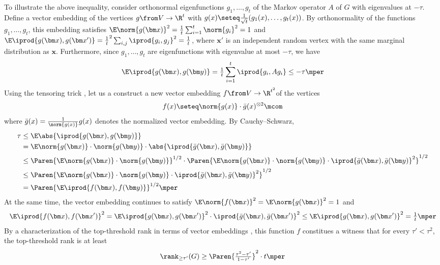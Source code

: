 To illustrate the above inequality, consider orthonormal eigenfunctions \(g_{1},\ldots,g_{t}\) of the Markov operator \(A\) of \(G\) with eigenvalues at \(-\tau\).
Define a vector embedding of the vertices \(g\from V\to \R^{t}\) with \(g(x)\seteq \tfrac 1{\sqrt t}(g_{1}(x),\ldots,g_{t}(x))\).
By orthonormality of the functions \(g_{1},\ldots,g_{t}\), this embedding satisfies \(\E\norm{g(\bm x)}^{2}=\tfrac 1 t\sum_{i=1}^{t}\norm{g_{i}}^{2}=1\) and \(\E\iprod{g(\bm x),g(\bm x')}=\tfrac 1 t^{2}\sum_{i,j}\iprod{g_{i},g_{j}}^{2}=\tfrac 1 t\), where \(\bm x'\) is an independent random vertex with the same marginal distribution as \(\bm x\).
Furthermore, since \(g_{1},\ldots,g_{t}\) are eigenfunctions with eigenvalue at most \(-\tau\), we have
\begin{equation}
  \E \iprod{g(\bm x),g(\bm y)}=\tfrac 1 t \sum_{i=1}^{t} \iprod{g_{i},A g_{i}} \le -\tau
  \mper
\end{equation}
Using the tensoring trick \cite{khot-vishnoi,arora-khot-kolla-steurer-tulsiani-vishnoi}, let us a construct a new vector embedding \(f\from V\to \R^{t^{2}}\)of the vertices
\begin{equation}
  f(x) \seteq \norm{g(x)} \cdot \bar g(x)^{\otimes 2}\mcom
\end{equation}
where \(\bar g(x)=\tfrac 1{\norm{g(x)}}g(x)\) denotes the normalized vector embedding.
By Cauchy--Schwarz,
\begin{align}
  \tau
  &\le \E \abs{\iprod{g(\bm x),g(\bm y)}}\\
  &=\E \norm{g(\bm x)}\cdot \norm{g(\bm y)}\cdot \abs{\iprod{\bar g(\bm x),\bar g(\bm y)}}\\
  &\le \Paren{\E \norm{g(\bm x)}\cdot \norm{g(\bm y)}}^{1/2} \cdot \Paren{\E \norm{g(\bm x)}\cdot \norm{g(\bm y)}\cdot \iprod{\bar g(\bm x),\bar g(\bm y)}^{2}}^{1/2}
  \\
  &\le  \Paren{\E \norm{g(\bm x)}\cdot \norm{g(\bm y)}\cdot \iprod{\bar g(\bm x),\bar g(\bm y)}^{2}}^{1/2}
  \\
  &=  \Paren{\E \iprod{f(\bm x),f(\bm y)}}^{1/2}
    \mper
\end{align}
At the same time, the vector embedding continues to satisfy \(\E \norm{f(\bm x)}^{2}=\E \norm{g(\bm x)}^{2}=1\) and
\begin{equation}
  \E \iprod{f(\bm x),f(\bm x')}^{2}=  \E \iprod{g(\bm x),g(\bm x')}^{2}\cdot \iprod{\bar g(\bm x),\bar g(\bm x')}^{2}
  \le  \E \iprod{g(\bm x),g(\bm x')}^{2}=\tfrac 1 t
  \mper
\end{equation}
By a characterization of the top-threshold rank in terms of vector embeddings \cite{barak-raghavendra-steurer}, this function \(f\) constitues a witness that for every \(\tau'<\tau^{2}\), the top-threshold rank is at least
\begin{equation}
  \rank_{\ge  \tau'}(G)\ge \Paren{\tfrac {\tau^{2}-\tau'}{1-\tau'}}^{2} \cdot t
  \mper
\end{equation}

